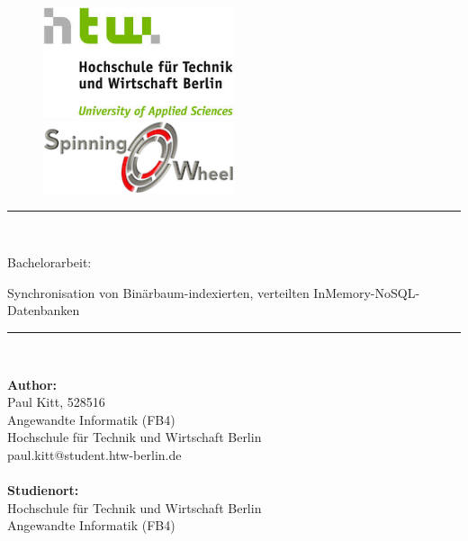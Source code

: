 \documentclass[a4paper,11pt,oneside,%
headsepline,												%
footsepline,												%
bibtotocnumbered									%
]{scrreprt}
\newcommand{\HRule}{\rule{\linewidth}{0.5mm}}
\begin{document}
\maketitle
\begin{titlepage}
	\begin{center}
	
		\begin{figure}[!htb]
			\begin{center}
		  		\includegraphics[width=0.5\textwidth]{bilder/htwLogo.jpeg}
			\end{center}
		\endminipage\hfill
		\begin{center}
	 		\includegraphics[width=0.5\textwidth]{bilder/Spinning_O_Wheel-200.png}
		\end{center}	
		\endminipage
	\end{figure}
	
	 \vfill
	 \HRule \\[0.4cm]
	    {\bfseries\Large
	        \begin{LARGE}
	        Bachelorarbeit:\\
	        \end{LARGE} 
	        Synchronisation von Binärbaum-indexierten, verteilten
	InMemory-NoSQL-Datenbanken\\
	    }    
	\HRule \\[1.5cm]
	 \vfill
	
	\begin{minipage}{0.4\textwidth}
		\begin{flushleft} \large
		\textbf{Author:}\\
		Paul Kitt, 528516 \\
		Angewandte Informatik (FB4) \\	
		Hochschule für Technik und Wirtschaft Berlin\\
		paul.kitt@student.htw-berlin.de	\\~\\
		\textbf{Studienort:}	\\
		Hochschule für Technik und Wirtschaft Berlin \\
		Angewandte Informatik (FB4) \\
		\end{flushleft}
	\end{minipage}
	\begin{minipage}{0.4\textwidth}
		\begin{flushright} \large


\end{flushright}
\end{minipage}
\end{center}
\end{titlepage}
\end{document}
